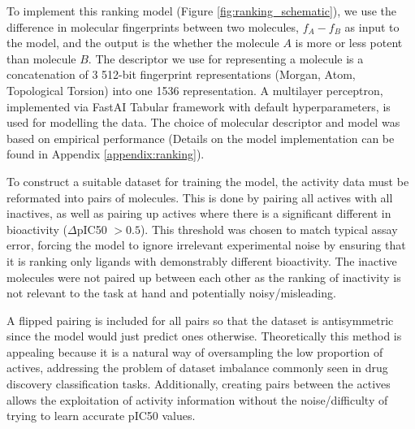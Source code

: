 To implement this ranking model (Figure \ref{fig:ranking_schematic}), we use the difference in molecular fingerprints between two molecules, $f_A - f_B$ as input to the model, and the output is the whether the molecule $A$ is more or less potent than molecule $B$. The descriptor we use for representing a molecule is a concatenation of 3 512-bit fingerprint representations (Morgan, Atom, Topological Torsion) into one 1536 representation. A multilayer perceptron, implemented via FastAI Tabular framework \cite{howard2018fastai} with default hyperparameters, is used for modelling the data. The choice of molecular descriptor and model was based on empirical performance (Details on the model implementation can be found in Appendix \ref{appendix:ranking}). %

To construct a suitable dataset for training the model, the activity data must be reformated into pairs of molecules. This is done by pairing all actives with all inactives, as well as pairing up actives where there is a significant different in bioactivity ($\Delta$pIC50 $>0.5$). This threshold was chosen to match typical assay error, forcing the model to ignore irrelevant experimental noise by ensuring that it is ranking only ligands with demonstrably different bioactivity. The inactive molecules were not paired up between each other as the ranking of inactivity is not relevant to the task at hand and potentially noisy/misleading.

A flipped pairing is included for all pairs so that the dataset is antisymmetric since the model would just predict ones otherwise. Theoretically this method is appealing because it is a natural way of oversampling the low proportion of actives, addressing the problem of dataset imbalance commonly seen in drug discovery classification tasks. Additionally, creating pairs between the actives allows the exploitation of activity information without the noise/difficulty of trying to learn accurate pIC50 values.


